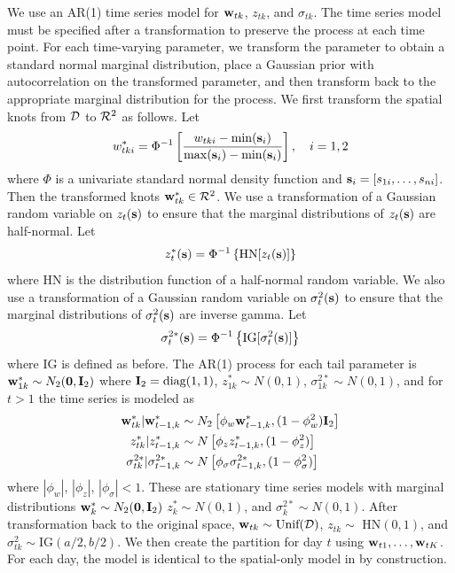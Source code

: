 \documentclass[useAMS,usenatbib,referee]{biom}
\begin{document}
We use an AR(1) time series model for $\mbox{\bf w}_{tk}$, $z_{tk}$, and $\sigma_{tk}$.
The time series model must be specified after a transformation to preserve the \skewt process at each time point.
For each time-varying parameter, we transform the parameter to obtain a standard normal marginal distribution, place a Gaussian prior with autocorrelation on the transformed parameter, and then transform back to the appropriate marginal distribution for the \skewt process.
We first transform the spatial knots from $\calD$ to $\calR^2$ as follows.
Let
\begin{align} \label{steq:wstar}
  w^*_{tki} = \Phi^{-1}\left[ \frac{ w_{tki} - \min(\bs_i)}{ \max(\bs_i) - \min(\bs_i) } \right], \quad i = 1, 2
\end{align}
where $\Phi$ is a univariate standard normal density function and $\mbox{\bf s}_i = [s_{1i}, \ldots, s_{ni}]$.
Then the transformed knots $\bw^*_{tk} \in \calR^2$.
We use a transformation of a Gaussian random variable on $z_{t}(\mbox{\bf s})$ to ensure that the marginal distributions of $z_t(\mbox{\bf s})$ are half-normal.
Let
\begin{align} \label{steq:zstar}
  z^*_t(\bs) = \Phi^{-1}\left\{ \text{HN}[z_t(\bs)] \right\}
\end{align}
where HN is the distribution function of a half-normal random variable.
We also use a transformation of a Gaussian random variable on $\sigma^2_t(\mbox{\bf s})$ to ensure that the marginal distributions of $\sigma^2_t(\mbox{\bf s})$ are inverse gamma.
Let
\begin{align} \label{steq:sigmastar}
  \sigma^{2*}_t(\bs) =\Phi^{-1}\left\{ \text{IG}[\sigma^2_t(\bs)] \right\}
\end{align}
where IG is defined as before.
The AR(1) process for each tail parameter is $\mbox{\bf w}^*_{1k} \sim N_2(\mbox{\boldmath $0$}, \mbox{\bf I}_2)$ where $\mbox{\bf I}_2 = \text{diag}(1, 1)$, $z^*_{1k} \sim N(0, 1)$, $\sigma^{2*}_{1k} \sim N(0, 1)$, and for $t > 1$ the time series is modeled as
\begin{align}
  \bw^*_{tk} | \bw^*_{t-1, k} &\sim N_2\left[\phi_w \bw^*_{t-1, k}, (1 - \phi_w^2) \bI_2 \right] \label{steq:ts-wstar}\\
  z^*_{tk} | z^*_{t-1, k} &\sim N \left[\phi_z z^*_{t-1, k}, (1 - \phi_z^2)\right] \label{steq:ts-zstar} \\
  \sigma^{2*}_{tk} | \sigma^{2*}_{t-1, k} &\sim N \left[\phi_\sigma \sigma^{2*}_{t-1, k}, (1 - \phi_\sigma^2) \right] \label{steq:ts-sigmastar}
\end{align}
where $|\phi_w|$, $|\phi_z|$, $|\phi_\sigma| < 1$.
These are stationary time series models with marginal distributions \hbox{$\mbox{\bf w}^*_{k} \sim N_2(\mbox{\boldmath $0$}, \mbox{\bf I}_2)$} \hbox{$z^*_{k} \sim N(0, 1)$}, and \hbox{$\sigma^{2*}_{k} \sim N(0, 1)$}.
After transformation back to the original space, $\bw_{tk} \sim \text{Unif}(\calD)$, $z_{tk} \sim $ HN$(0, 1)$, and $\sigma^2_{tk} \sim \text{IG}(a / 2, b / 2)$.
We then create the partition for day $t$ using $\mbox{\bf w}_{t1}, \ldots, \mbox{\bf w}_{tK}$.
For each day, the model is identical to the spatial-only model in  by construction.
\end{document}
